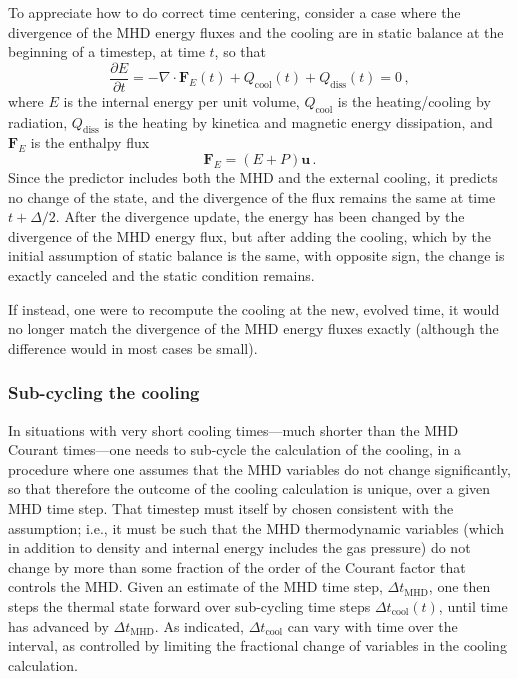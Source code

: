 \documentclass[paper=a4,fontsize=11pt]{scrartcl}
\numberwithin{equation}{section}		%
\numberwithin{figure}{section}			%
\numberwithin{table}{section}				%
\begin{document}
To appreciate how to do correct time centering, consider a case where the divergence of the MHD energy fluxes and the cooling are in static balance at the beginning of a timestep, at time $t$, so that
\def\dtcool{\Delta t_{\mathrm{cool}}}
\def\dtmhd{\Delta t_{\mathrm{MHD}}}
\def\qcool{Q_{\mathrm{cool}}}
\def\qdiss{Q_{\mathrm{diss}}}
\def\Eflux{\mathbf{F}_E}
\begin{equation}
      \frac{\partial E}{\partial t} = - \nabla\cdot {\Eflux}(t) + \qcool(t) +\qdiss(t) = 0\,,
\end{equation}
where $E$ is the internal energy per unit volume, $\qcool$ is the heating/cooling by radiation, $\qdiss$ is the heating by kinetica and magnetic energy dissipation, and $\Eflux$ is the enthalpy flux
\def\uu{\mathbf{u}}
\begin{equation}
    \Eflux = (E+P) \uu \,.
\end{equation}
Since the predictor includes both the MHD and the external cooling, it predicts no change of the state, and the divergence of the flux remains the same at time $t+\Delta/2$.   After the divergence update, the energy has been changed by the divergence of the MHD energy flux, but after adding the cooling, which by the initial assumption of static balance is the same, with opposite sign, the change is exactly canceled and the static condition remains.

If instead, one were to recompute the cooling at the new, evolved time, it would no longer match the divergence of the MHD energy fluxes exactly (although the difference would in most cases be small).

\subsubsection{Sub-cycling the cooling}
In situations with very short cooling times---much shorter than the MHD Courant times---one needs to sub-cycle the calculation of the cooling, in a procedure where one assumes that the MHD variables do not change significantly, so that therefore the outcome of the cooling calculation is unique, over a given MHD time step.   That timestep must itself by chosen consistent with the assumption; i.e., it must be such that the MHD thermodynamic variables (which in  addition to density and internal energy includes the gas pressure) do not change by more than some fraction of the order of the Courant factor that controls the MHD.  Given an estimate of the MHD time step, $\dtmhd$, one then steps the thermal state forward over sub-cycling time steps $\dtcool(t)$, until time has advanced by $\dtmhd$.  As indicated, $\dtcool$ can vary with time over the interval, as controlled by limiting the fractional change of variables in the cooling calculation.
\end{document}
